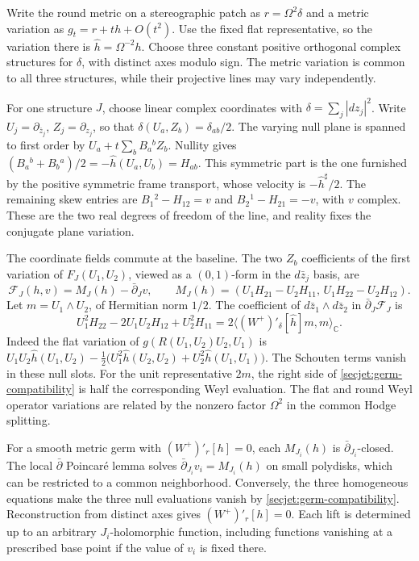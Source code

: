 \documentclass[11pt]{article}
\numberwithin{equation}{section}
\theoremstyle{definition}
\theoremstyle{remark}
\begin{document}
Write the round metric on a stereographic patch as \(r=\Omega^2\delta\)
and a metric variation as \(g_t=r+th+O(t^2)\). Use the fixed flat
representative, so the variation there is \(\widehat h=\Omega^{-2}h\).
Choose three constant positive orthogonal complex structures for
\(\delta\), with distinct axes modulo sign. The metric variation is
common to all three structures, while their projective lines may vary
independently.

For one structure \(J\), choose linear complex coordinates with
\(\delta=\sum_j|dz_j|^2\). Write \(U_j=\partial_{\bar z_j}\),
\(Z_j=\partial_{z_j}\), so that \(\delta(U_a,Z_b)=\delta_{ab}/2\).
The varying null plane is spanned to first order by
\(U_a+t\sum_b B_a{}^b Z_b\). Nullity gives
\((B_a{}^b+B_b{}^a)/2=-\widehat h(U_a,U_b)=H_{ab}\).
This symmetric part is the one furnished by the positive symmetric
frame transport, whose velocity is \(-\widehat h^\sharp/2\).
The remaining skew entries are \(B_1{}^2-H_{12}=v\) and
\(B_2{}^1-H_{21}=-v\), with \(v\) complex. These are the two real
degrees of freedom of the line, and reality fixes the conjugate
plane variation.

The coordinate fields commute at the baseline. The two \(Z_b\)
coefficients of the first variation of \(F_J(U_1,U_2)\), viewed as
a \((0,1)\)-form in the \(d\bar z_j\) basis, are
\begin{equation}
 \label{secjet:germ-graph}
 \mathcal F_J(h,v)=M_J(h)-\bar\partial_Jv,\qquad
 M_J(h)=(U_1H_{21}-U_2H_{11},\,U_1H_{22}-U_2H_{12}).
\end{equation}
Let \(m=U_1\wedge U_2\), of Hermitian norm \(1/2\). The coefficient
of \(d\bar z_1\wedge d\bar z_2\) in \(\bar\partial_J\mathcal F_J\) is
\begin{equation}
 \label{secjet:germ-compatibility}
 U_1^2H_{22}-2U_1U_2H_{12}+U_2^2H_{11}
 =2\langle (W^+)'_\delta[\widehat h]m,m\rangle_{\mathbb C}.
\end{equation}
Indeed the flat variation of \(g(R(U_1,U_2)U_2,U_1)\) is
\(U_1U_2\widehat h(U_1,U_2)
-\tfrac12\bigl(U_1^2\widehat h(U_2,U_2)+
U_2^2\widehat h(U_1,U_1)\bigr)\). The Schouten terms vanish
in these null slots. For the unit representative \(2m\), the right
side of \eqref{secjet:germ-compatibility} is half the corresponding
Weyl evaluation. The flat and round Weyl operator variations are
related by the nonzero factor \(\Omega^2\) in the common Hodge
splitting.

For a smooth metric germ with \((W^+)'_r[h]=0\), each \(M_{J_i}(h)\)
is \(\bar\partial_{J_i}\)-closed. The local \(\bar\partial\) Poincar\'e
lemma solves \(\bar\partial_{J_i}v_i=M_{J_i}(h)\) on small polydisks,
which can be restricted to a common neighborhood. Conversely, the
three homogeneous equations make the three null evaluations vanish
by \eqref{secjet:germ-compatibility}. Reconstruction from distinct
axes gives \((W^+)'_r[h]=0\). Each lift is determined up to an
arbitrary \(J_i\)-holomorphic function, including functions vanishing
at a prescribed base point if the value of \(v_i\) is fixed there.
\end{document}
